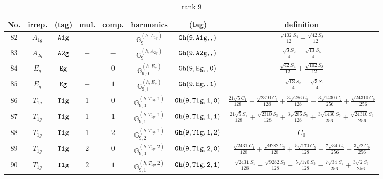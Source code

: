 \documentclass[fleqn,8pt]{jsarticle}
\begin{document}
\begin{table}[ht!]
\begin{center}
\caption{rank 9}
\renewcommand{\arraystretch}{1.3}
\begin{tabular}{cccccccc} \hline \hline
No. & irrep. & (tag) & mul. & comp. & harmonics & (tag) & definition \\ \hline
$ 82 $ & $ A_{1g} $ & $ {\tt A1g} $ & $ - $ & $ - $ & $ \mathbb{G}_{9}^{(h,A_{1g})} $ & $ {\tt Gh(9,A1g,,)} $ & $ \frac{\sqrt{102} S_{4}}{12} - \frac{\sqrt{42} S_{8}}{12} $ \\
$ 83 $ & $ A_{2g} $ & $ {\tt A2g} $ & $ - $ & $ - $ & $ \mathbb{G}_{9}^{(h,A_{2g})} $ & $ {\tt Gh(9,A2g,,)} $ & $ \frac{\sqrt{3} S_{2}}{4} - \frac{\sqrt{13} S_{6}}{4} $ \\
$ 84 $ & $ E_{g} $ & $ {\tt Eg} $ & $ - $ & $ 0 $ & $ \mathbb{G}_{9,0}^{(h,E_{g})} $ & $ {\tt Gh(9,Eg,,0)} $ & $ \frac{\sqrt{42} S_{4}}{12} + \frac{\sqrt{102} S_{8}}{12} $ \\
$ 85 $ & $ E_{g} $ & $ {\tt Eg} $ & $ - $ & $ 1 $ & $ \mathbb{G}_{9,1}^{(h,E_{g})} $ & $ {\tt Gh(9,Eg,,1)} $ & $ - \frac{\sqrt{13} S_{2}}{4} - \frac{\sqrt{3} S_{6}}{4} $ \\
$ 86 $ & $ T_{1g} $ & $ {\tt T1g} $ & $ 1 $ & $ 0 $ & $ \mathbb{G}_{9,0}^{(h,T_{1g},1)} $ & $ {\tt Gh(9,T1g,1,0)} $ & $ \frac{21 \sqrt{5} C_{1}}{128} - \frac{\sqrt{2310} C_{3}}{128} + \frac{3 \sqrt{286} C_{5}}{128} - \frac{3 \sqrt{1430} C_{7}}{256} + \frac{\sqrt{24310} C_{9}}{256} $ \\
$ 87 $ & $ T_{1g} $ & $ {\tt T1g} $ & $ 1 $ & $ 1 $ & $ \mathbb{G}_{9,1}^{(h,T_{1g},1)} $ & $ {\tt Gh(9,T1g,1,1)} $ & $ \frac{21 \sqrt{5} S_{1}}{128} + \frac{\sqrt{2310} S_{3}}{128} + \frac{3 \sqrt{286} S_{5}}{128} + \frac{3 \sqrt{1430} S_{7}}{256} + \frac{\sqrt{24310} S_{9}}{256} $ \\
$ 88 $ & $ T_{1g} $ & $ {\tt T1g} $ & $ 1 $ & $ 2 $ & $ \mathbb{G}_{9,2}^{(h,T_{1g},1)} $ & $ {\tt Gh(9,T1g,1,2)} $ & $ C_{0} $ \\
$ 89 $ & $ T_{1g} $ & $ {\tt T1g} $ & $ 2 $ & $ 0 $ & $ \mathbb{G}_{9,0}^{(h,T_{1g},2)} $ & $ {\tt Gh(9,T1g,2,0)} $ & $ \frac{\sqrt{2431} C_{1}}{128} + \frac{\sqrt{9282} C_{3}}{128} + \frac{5 \sqrt{170} C_{5}}{128} + \frac{7 \sqrt{34} C_{7}}{256} + \frac{3 \sqrt{2} C_{9}}{256} $ \\
$ 90 $ & $ T_{1g} $ & $ {\tt T1g} $ & $ 2 $ & $ 1 $ & $ \mathbb{G}_{9,1}^{(h,T_{1g},2)} $ & $ {\tt Gh(9,T1g,2,1)} $ & $ \frac{\sqrt{2431} S_{1}}{128} - \frac{\sqrt{9282} S_{3}}{128} + \frac{5 \sqrt{170} S_{5}}{128} - \frac{7 \sqrt{34} S_{7}}{256} + \frac{3 \sqrt{2} S_{9}}{256} $ \\

\end{tabular}
\end{center}
\end{table}
\end{document}
